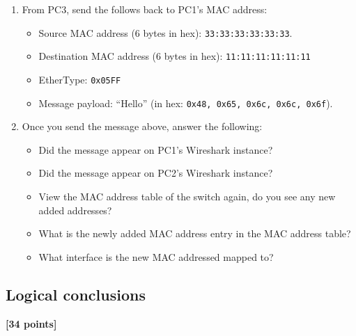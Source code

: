 \documentclass[pdftex,12pt,a4paper]{article}
\begin{document}
            \begin{enumerate}
                \item From PC3, send the follows back to PC1's MAC address:
                    \begin{itemize}
                        \item Source MAC address (6 bytes in hex):
                        \texttt{33:33:33:33:33:33}.
                        \item Destination MAC address (6 bytes in hex):
                        \texttt{11:11:11:11:11:11}
                        \item EtherType: \texttt{0x05FF}
                        \item Message payload: ``Hello'' (in hex: \texttt{0x48,
                        0x65, 0x6c, 0x6c, 0x6f}).
                    \end{itemize}

                \item Once you send the message above, answer the following:
                    \begin{itemize}
                        \item Did the message appear on PC1's Wireshark
                        instance?
                        \item Did the message appear on PC2's Wireshark
                        instance?
                        \item View the MAC address table of the switch again,
                        do you see any new added addresses? 
                        \item What is the newly added MAC address entry in the
                        MAC address table?
                        \item What interface is the new MAC addressed mapped
                        to?
                    \end{itemize}
            \end{enumerate}

        \subsection{Logical conclusions}
            \begin{flushright}
                \textbf{[34 points]}
            \end{flushright}
\end{document}
